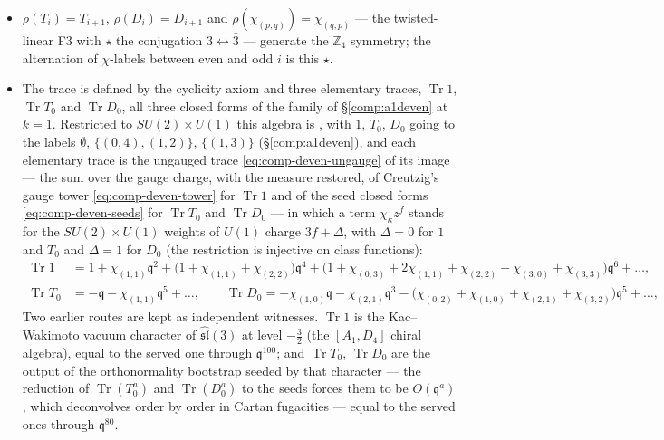 \documentclass[11pt]{amsart}
\DeclareMathOperator{\Tr}{Tr}
\newcommand\fq{\mathfrak{q}}
\newcommand\bZ{\mathbb{Z}}
\theoremstyle{remark}
\begin{document}
\begin{itemize}
  () are the curves of 
  (\S\ref{comp:a1deven}) with the $SU(3)$ weight: $T_i$ is the loop at
  marked point $i$ with the curve $(i+1,2)$, $D_i$ the curve $(i+1,3)$, and
  a monomial the union of its letters' curves.
\item $\rho(T_i)=T_{i+1}$, $\rho(D_i)=D_{i+1}$ and $\rho(\chi_{(p,q)})=\chi_{(q,p)}$
  --- the twisted-linear F3 with $\star$ the conjugation $3\leftrightarrow\bar3$ ---
  generate the $\bZ_4$ symmetry; the alternation of $\chi$-labels between
  even and odd $i$ is this $\star$.
\item The trace is defined by the cyclicity axiom and three elementary
  traces, $\Tr1$, $\Tr T_0$ and $\Tr D_0$, all three closed forms of the
  family of \S\ref{comp:a1deven} at $k=1$.  Restricted to $SU(2)\times U(1)$
  this algebra is , with $1$, $T_0$, $D_0$ going to the
  labels $\emptyset$, $\{(0,4),(1,2)\}$, $\{(1,3)\}$
  (\S\ref{comp:a1deven}), and each elementary trace is the ungauged trace
  \eqref{eq:comp-deven-ungauge} of its image --- the sum over the gauge
  charge, with the measure restored, of Creutzig's gauge tower
  \eqref{eq:comp-deven-tower} for $\Tr1$ and of the seed closed forms
  \eqref{eq:comp-deven-seeds} for $\Tr T_0$ and $\Tr D_0$ --- in which a term
  $\chi_\kappa z^f$ stands for the $SU(2)\times U(1)$ weights of $U(1)$
  charge $3f+\Delta$, with $\Delta=0$ for $1$ and $T_0$ and $\Delta=1$ for
  $D_0$ (the restriction is injective on class functions):
\begin{equation}\label{eq:comp-su3-traces}
\begin{aligned}
  \Tr1&=1+\chi_{(1,1)}\fq^2+\bigl(1+\chi_{(1,1)}+\chi_{(2,2)}\bigr)\fq^4
        +\bigl(1+\chi_{(0,3)}+2\chi_{(1,1)}+\chi_{(2,2)}+\chi_{(3,0)}+\chi_{(3,3)}\bigr)\fq^6+\dots,\\
  \Tr T_0&=-\fq-\chi_{(1,1)}\fq^5+\dots,\qquad
  \Tr D_0=-\chi_{(1,0)}\fq-\chi_{(2,1)}\fq^3-\bigl(\chi_{(0,2)}+\chi_{(1,0)}+\chi_{(2,1)}+\chi_{(3,2)}\bigr)\fq^5+\dots,
\end{aligned}
\end{equation}
  Two earlier routes are kept as independent witnesses.  $\Tr1$ is the
  Kac--Wakimoto vacuum character of $\widehat{\mathfrak{sl}}(3)$ at level
  $-\tfrac32$ (the $[A_1,D_4]$ chiral algebra), equal to the served one
  through $\fq^{100}$; and $\Tr T_0$, $\Tr D_0$ are the output of the
  orthonormality bootstrap seeded by that character --- the reduction of
  $\Tr(T_0^a)$ and $\Tr(D_0^a)$ to the seeds forces them to be
  $O(\fq^a)$, which deconvolves order by order in Cartan fugacities ---
  equal to the served ones through $\fq^{80}$.
\end{itemize}
\end{document}

